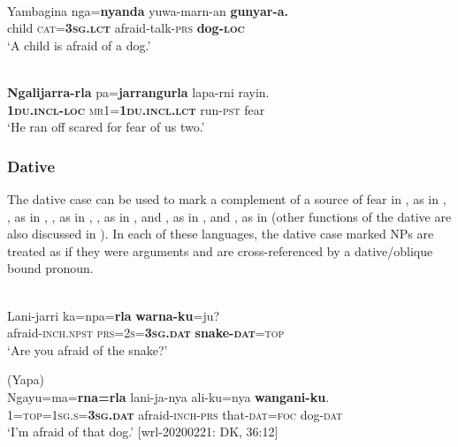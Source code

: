 \documentclass[output=paper,colorlinks,citecolor=brown]{langscibook}
\begin{document}
\ea 
{} \\
\gll Yambagina nga=\textbf{nyanda} yuwa-marn-an \textbf{gunyar-a.} \\
child \textsc{cat=\textbf{3sg.lct}} afraid-talk-\textsc{prs} \textbf{dog-\textsc{loc}} \\
\glt `A child is afraid of a dog.'
\label{ex:bro31}
\z


\ea 
{} \\
\gll \textbf{Ngalijarra-rla} pa=\textbf{jarrangurla} lapa-rni rayin. \\
\textbf{\textsc{1du.incl-loc}} \textsc{mr1=\textbf{1du.incl.lct}} run-\textsc{pst} fear \\
\glt `He ran off scared for fear of us two.'
\label{ex:bro32}
\z



\subsubsection{Dative}
\label{subsubsec:dative}

The dative case can be used to mark a complement of a source of fear in , as in , , as in , , as in , , as in , and , as in , and , as in  (other functions of the dative are also discussed in ). In each of these languages, the dative case marked NPs are treated as if they were arguments and are cross-referenced by a dative/oblique bound pronoun.

\ea
{} \\
\gll Lani-jarri ka=npa=\textbf{rla} \textbf{warna-ku}=ju? \\
afraid-\textsc{inch.npst} \textsc{prs=2s=\textbf{3sg.dat}} \textbf{snake-\textsc{dat}}=\textsc{top} \\
\glt `Are you afraid of the snake?'
\label{ex:bro33}
\z

\ea 
\textnormal{ (Yapa)} \\
\gll Ngayu=ma=\textbf{rna=rla} lani-ja-nya ali-ku=nya \textbf{wangani-ku}. \\
1=\textsc{top=1sg.s=\textbf{3sg.dat}} afraid-\textsc{inch-prs} that-\textsc{dat=foc} dog-\textsc{dat} \\
\glt `I'm afraid of that dog.' $[$wrl-20200221: DK, 36:12$]$
\label{ex:bro34}
\z
\end{document}

